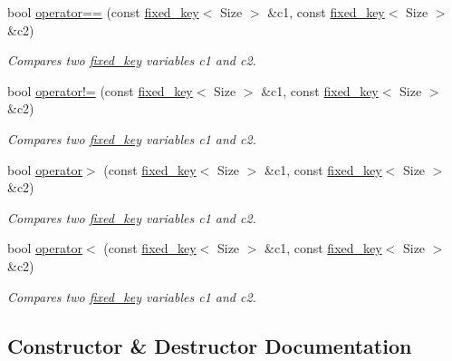 \begin{DoxyCompactItemize}
bool \mbox{\hyperlink{classaacio_1_1fixed__key_a30f70a7e52cc0469c1e48d261fec6f48}{operator==}} (const \mbox{\hyperlink{classaacio_1_1fixed__key}{fixed\+\_\+key}}$<$ Size $>$ \&c1, const \mbox{\hyperlink{classaacio_1_1fixed__key}{fixed\+\_\+key}}$<$ Size $>$ \&c2)
\begin{DoxyCompactList}\small\item\em Compares two \mbox{\hyperlink{classaacio_1_1fixed__key}{fixed\+\_\+key}} variables c1 and c2. \end{DoxyCompactList}\item 
bool \mbox{\hyperlink{classaacio_1_1fixed__key_ac19901f66d7942ad087edef0daef485d}{operator!=}} (const \mbox{\hyperlink{classaacio_1_1fixed__key}{fixed\+\_\+key}}$<$ Size $>$ \&c1, const \mbox{\hyperlink{classaacio_1_1fixed__key}{fixed\+\_\+key}}$<$ Size $>$ \&c2)
\begin{DoxyCompactList}\small\item\em Compares two \mbox{\hyperlink{classaacio_1_1fixed__key}{fixed\+\_\+key}} variables c1 and c2. \end{DoxyCompactList}\item 
bool \mbox{\hyperlink{classaacio_1_1fixed__key_a0d80d7fcf875276760867c2be8b66438}{operator$>$}} (const \mbox{\hyperlink{classaacio_1_1fixed__key}{fixed\+\_\+key}}$<$ Size $>$ \&c1, const \mbox{\hyperlink{classaacio_1_1fixed__key}{fixed\+\_\+key}}$<$ Size $>$ \&c2)
\begin{DoxyCompactList}\small\item\em Compares two \mbox{\hyperlink{classaacio_1_1fixed__key}{fixed\+\_\+key}} variables c1 and c2. \end{DoxyCompactList}\item 
bool \mbox{\hyperlink{classaacio_1_1fixed__key_aed9cc9961cc5c84cdefa193a7baf3f9a}{operator$<$}} (const \mbox{\hyperlink{classaacio_1_1fixed__key}{fixed\+\_\+key}}$<$ Size $>$ \&c1, const \mbox{\hyperlink{classaacio_1_1fixed__key}{fixed\+\_\+key}}$<$ Size $>$ \&c2)
\begin{DoxyCompactList}\small\item\em Compares two \mbox{\hyperlink{classaacio_1_1fixed__key}{fixed\+\_\+key}} variables c1 and c2. \end{DoxyCompactList}\end{DoxyCompactItemize}


\subsection{Constructor \& Destructor Documentation}
\mbox{\label{classaacio_1_1fixed__key_a08beebc009535d8dd7390841d0582ee6}} 
